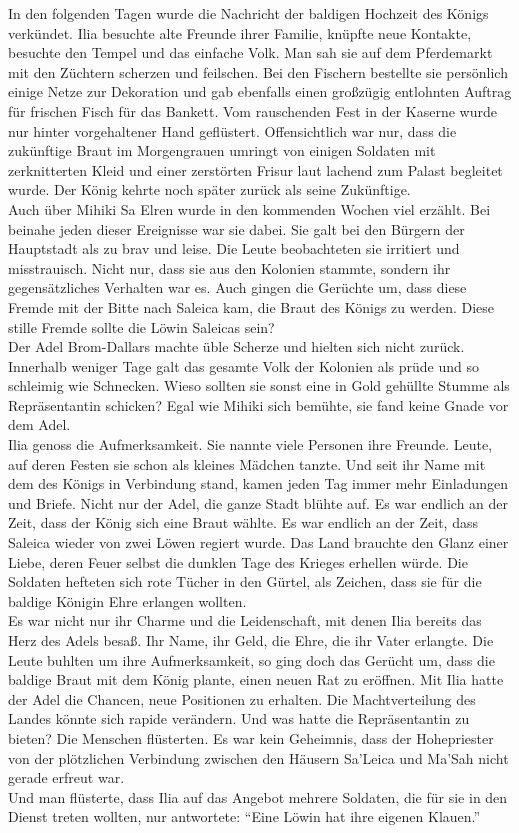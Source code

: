 In den folgenden Tagen wurde die Nachricht der baldigen Hochzeit des Königs verkündet. Ilia 
besuchte alte Freunde ihrer Familie, knüpfte neue Kontakte, besuchte den Tempel und das einfache 
Volk. Man sah sie auf dem Pferdemarkt mit den Züchtern scherzen und feilschen. Bei den Fischern 
bestellte sie persönlich einige Netze zur Dekoration und gab ebenfalls einen großzügig entlohnten 
Auftrag für frischen Fisch für das Bankett. Vom rauschenden Fest in der Kaserne wurde nur hinter 
vorgehaltener Hand geflüstert. Offensichtlich war nur, dass die zukünftige Braut im Morgengrauen 
umringt von einigen Soldaten mit zerknitterten Kleid und einer zerstörten Frisur laut lachend zum 
Palast begleitet wurde. Der König kehrte noch später zurück als seine Zukünftige.\\
Auch über Mihiki Sa Elren wurde in den kommenden Wochen viel erzählt. Bei beinahe jeden dieser 
Ereignisse war sie dabei. Sie galt bei den Bürgern der Hauptstadt als zu brav und leise. Die Leute 
beobachteten sie irritiert und misstrauisch. Nicht nur, dass sie aus den Kolonien stammte, sondern 
ihr gegensätzliches Verhalten war es. Auch gingen die Gerüchte um, dass diese Fremde mit der Bitte 
nach Saleica kam, die Braut des Königs zu werden. Diese stille Fremde sollte die Löwin 
Saleicas sein?\\
Der Adel Brom-Dallars machte üble Scherze und hielten sich nicht zurück. Innerhalb weniger Tage 
galt das gesamte Volk der Kolonien als prüde und so schleimig wie Schnecken. Wieso sollten sie 
sonst eine in Gold gehüllte Stumme als Repräsentantin schicken? Egal wie Mihiki sich bemühte, sie 
fand keine Gnade vor dem Adel.\\
Ilia genoss die Aufmerksamkeit. Sie nannte viele Personen ihre Freunde. Leute, auf deren Festen sie 
schon als kleines Mädchen tanzte. Und seit ihr Name mit dem des Königs in Verbindung stand, kamen 
jeden Tag immer mehr Einladungen und Briefe. Nicht nur der Adel, die ganze Stadt blühte auf. Es war 
endlich an der Zeit, dass der König sich eine Braut wählte. Es war endlich an der Zeit, dass 
Saleica wieder von zwei Löwen regiert wurde. Das Land brauchte den Glanz einer Liebe, deren Feuer 
selbst die dunklen Tage des Krieges erhellen würde. Die Soldaten hefteten sich rote Tücher in den 
Gürtel, als Zeichen, dass sie für die baldige Königin Ehre erlangen wollten.\\
Es war nicht nur ihr Charme und die Leidenschaft, mit denen Ilia bereits das Herz des Adels besaß. 
Ihr Name, ihr Geld, die Ehre, die ihr Vater erlangte. Die Leute buhlten um ihre Aufmerksamkeit, so 
ging doch das Gerücht um, dass die baldige Braut mit dem König plante, einen neuen Rat zu eröffnen. 
Mit Ilia hatte der Adel die Chancen, neue Positionen zu erhalten. Die Machtverteilung des Landes 
könnte sich rapide verändern. Und was hatte die Repräsentantin zu bieten? Die Menschen flüsterten. 
Es war kein Geheimnis, dass der Hohepriester von der plötzlichen Verbindung zwischen den Häusern 
Sa'Leica und Ma'Sah nicht gerade erfreut war.\\
Und man flüsterte, dass Ilia auf das Angebot mehrere Soldaten, die für sie in den Dienst 
treten wollten, nur antwortete: ``Eine Löwin hat ihre eigenen Klauen.''
